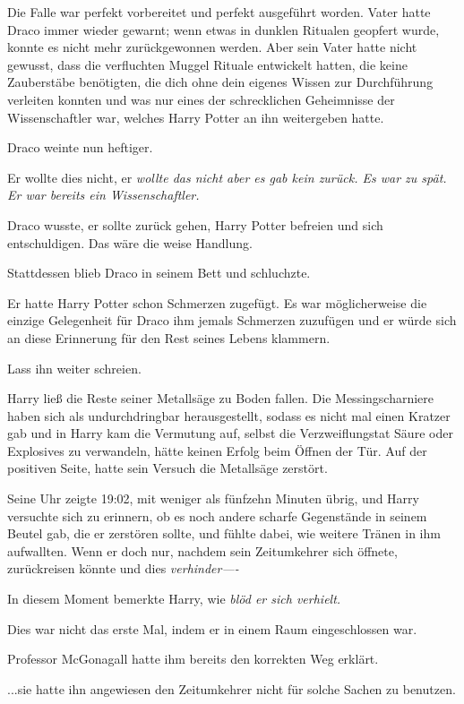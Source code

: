 {Die Falle war perfekt vorbereitet und perfekt ausgeführt worden. Vater hatte Draco immer wieder gewarnt; wenn etwas in dunklen Ritualen geopfert wurde, konnte es nicht mehr zurückgewonnen werden. Aber sein Vater hatte nicht gewusst, dass die verfluchten Muggel Rituale entwickelt hatten, die keine Zauberstäbe benötigten, die dich ohne dein eigenes Wissen zur Durchführung verleiten konnten und was nur eines der schrecklichen Geheimnisse der Wissenschaftler war, welches Harry Potter an ihn weitergeben hatte.

Draco weinte nun heftiger.

Er wollte dies nicht, er \emph{wollte das nicht aber es gab kein zurück. Es war zu spät. Er war bereits ein Wissenschaftler.}

Draco wusste, er sollte zurück gehen, Harry Potter befreien und sich entschuldigen. Das wäre die weise Handlung.

Stattdessen blieb Draco in seinem Bett und schluchzte.

Er hatte Harry Potter schon Schmerzen zugefügt. Es war möglicherweise die einzige Gelegenheit für Draco ihm jemals Schmerzen zuzufügen und er würde sich an diese Erinnerung für den Rest seines Lebens klammern.

Lass ihn weiter schreien.

Harry ließ die Reste seiner Metallsäge zu Boden fallen. Die Messingscharniere haben sich als undurchdringbar herausgestellt, sodass es nicht mal einen Kratzer gab und in Harry kam die Vermutung auf, selbst die Verzweiflungstat Säure oder Explosives zu verwandeln, hätte keinen Erfolg beim Öffnen der Tür. Auf der positiven Seite, hatte sein Versuch die Metallsäge zerstört.

Seine Uhr zeigte 19:02, mit weniger als fünfzehn Minuten übrig, und Harry versuchte sich zu erinnern, ob es noch andere scharfe Gegenstände in seinem Beutel gab, die er zerstören sollte, und fühlte dabei, wie weitere Tränen in ihm aufwallten. Wenn er doch nur, nachdem sein Zeitumkehrer sich öffnete, zurückreisen könnte und dies \emph{verhinder----}

In diesem Moment bemerkte Harry, wie \emph{blöd er sich verhielt.}

Dies war nicht das erste Mal, indem er in einem Raum eingeschlossen war.

Professor McGonagall hatte ihm bereits den korrekten Weg erklärt.

...sie hatte ihn angewiesen den Zeitumkehrer nicht für solche Sachen zu benutzen.

}
